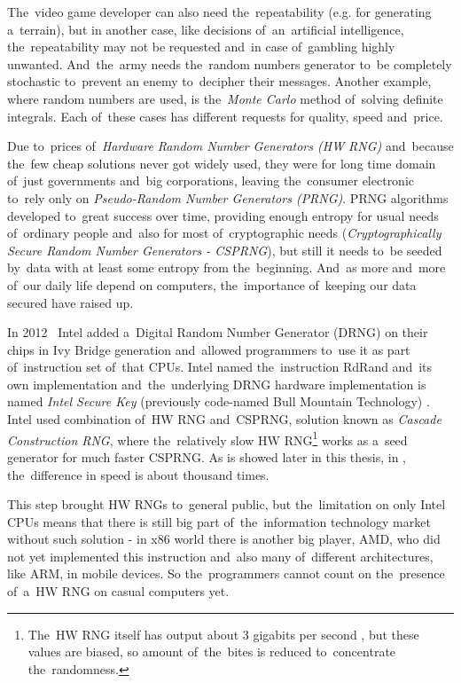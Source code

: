 \par{
The~video game developer can also need the~repeatability (e.g. for generating 
a~terrain), but in another case, like decisions of~an~artificial intelligence, 
the~repeatability may not be requested and~in case of~gambling highly unwanted. 
And~the~army needs the~random numbers generator to~be completely stochastic 
to~prevent an enemy to~decipher their messages. Another example, where random 
numbers are used, is the~{\em Monte Carlo} method of~solving definite integrals. 
Each of~these cases has different requests for quality, speed and~price.
}

\par{
Due to~prices of~{\em Hardware Random Number Generators (HW RNG)} 
and~because the~few cheap solutions never got widely used, 
they were for long time domain of~just governments and~big corporations,
leaving the~consumer electronic to~rely only on {\em Pseudo-Random Number 
Generators (PRNG)}. PRNG algorithms developed to~great success over time, 
providing enough entropy for usual needs of~ordinary people and~also for most 
of~cryptographic needs ({\em Cryptographically Secure Random Number 
Generators - CSPRNG}), but still it needs to~be seeded by~data with at least 
some entropy from the~beginning. And~as more and~more of~our daily life 
depend on computers, the~importance of~keeping our data secured have 
raised up. 
}

\par{
In 2012~\cite{IntelRdRandFindAbout} Intel added a~Digital Random Number 
Generator (DRNG) on their chips in Ivy Bridge generation
and~allowed programmers to~use it as part 
of~instruction set of~that CPUs. Intel named the~instruction RdRand and~its own 
implementation and~the~underlying DRNG hardware implementation is named 
{\em Intel Secure Key} (previously code-named Bull Mountain Technology)
\cite{IntelDRNGAnalysis}. Intel used combination of~HW RNG and~CSPRNG, 
solution known as {\em Cascade Construction RNG}, where the~relatively slow 
HW RNG\footnote{The~HW RNG itself has output about 3 gigabits per second
\cite{BehindRdRand}, but these values are biased, so amount of~the~bites 
is reduced to~concentrate the~randomness.} works as a~seed generator 
for much faster CSPRNG. As is showed later in this thesis, 
in , the~difference in speed 
is about thousand times.
}

\par{
This step brought HW RNGs to~general public, but the~limitation on only Intel 
CPUs means that there is still big part of~the~information technology market 
without such solution - in x86 world there is another big player, 
AMD, who did not yet implemented this instruction and~also many 
of~different architectures, like ARM, in mobile devices. 
So the~programmers cannot count on the~presence of~a~HW RNG 
on casual computers yet. 
}

